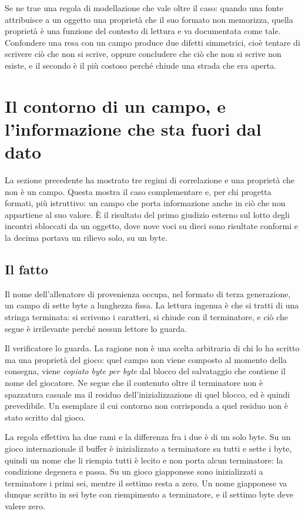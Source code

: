 Se ne trae una regola di modellazione che vale oltre il caso: quando una fonte attribuisce a un oggetto una proprietà che il suo formato non memorizza, quella proprietà è una funzione del contesto di lettura e va documentata come tale. Confondere una resa con un campo produce due difetti simmetrici, cioè tentare di scrivere ciò che non si scrive, oppure concludere che ciò che non si scrive non esiste, e il secondo è il più costoso perché chiude una strada che era aperta.

\section{Il contorno di un campo, e l'informazione che sta fuori dal dato}
\label{sec:contorno-campo}

La sezione precedente ha mostrato tre regimi di correlazione e una proprietà che non è un campo. Questa mostra il caso complementare e, per chi progetta formati, più istruttivo: un campo che porta informazione anche in ciò che non appartiene al suo valore. È il risultato del primo giudizio esterno sul lotto degli incontri sbloccati da un oggetto, dove nove voci su dieci sono risultate conformi e la decima portava un rilievo solo, su un byte.

\subsection{Il fatto}

Il nome dell'allenatore di provenienza occupa, nel formato di terza generazione, un campo di sette byte a lunghezza fissa. La lettura ingenua è che si tratti di una stringa terminata: si scrivono i caratteri, si chiude con il terminatore, e ciò che segue è irrilevante perché nessun lettore lo guarda.

Il verificatore lo guarda. La ragione non è una scelta arbitraria di chi lo ha scritto ma una proprietà del gioco: quel campo non viene composto al momento della consegna, viene \emph{copiato byte per byte} dal blocco del salvataggio che contiene il nome del giocatore. Ne segue che il contenuto oltre il terminatore non è spazzatura casuale ma il residuo dell'inizializzazione di quel blocco, ed è quindi prevedibile. Un esemplare il cui contorno non corrisponda a quel residuo non è stato scritto dal gioco.

La regola effettiva ha due rami e la differenza fra i due è di un solo byte. Su un gioco internazionale il buffer è inizializzato a terminatore su tutti e sette i byte, quindi un nome che li riempia tutti è lecito e non porta alcun terminatore: la condizione degenera e passa. Su un gioco giapponese sono inizializzati a terminatore i primi sei, mentre il settimo resta a zero. Un nome giapponese va dunque scritto in sei byte con riempimento a terminatore, e il settimo byte deve valere zero.

